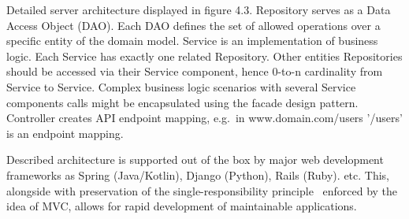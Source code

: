 Detailed server architecture displayed in figure 4.3.
Repository serves as a Data Access Object (DAO).
Each DAO defines the set of allowed operations over a specific entity of the domain model.
Service is an implementation of business logic.
Each Service has exactly one related Repository.
Other entities Repositories should be accessed via their Service component, hence 0-to-n cardinality from Service to Service.
Complex business logic scenarios with several Service components calls might be encapsulated using the facade design pattern.
Controller creates API endpoint mapping, e.g.\ in www.domain.com/users '/users' is an endpoint mapping.

Described architecture is supported out of the box by major web development frameworks as Spring (Java/Kotlin), Django (Python), Rails (Ruby).\cite{spring,django,ruby} etc.
This, alongside with preservation of the single-responsibility principle~\cite{wiki-srp} enforced by the idea of MVC, allows for rapid development of maintainable applications.